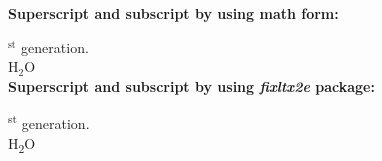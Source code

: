 \documentclass[a4paper, 12pt, onecolumn]{article}
\begin{document}
	
	\noindent
	\textbf{Superscript and subscript by using math form:}
	
	$^\textrm{st}$ generation.\\ %
	
	\noindent
	H$_2$O\\
	
	
	\noindent
	\textbf{Superscript and subscript by using \emph{fixltx2e} package:}
	
	\textsuperscript{st} generation.\\
	
	\noindent
	H\textsubscript{2}O
	
\end{document}
